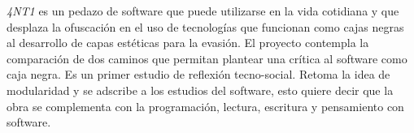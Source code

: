 \textit{4NT1} es un pedazo de software que puede utilizarse en la vida cotidiana y que desplaza la ofuscación en el uso de tecnologías que funcionan como cajas negras al desarrollo de capas estéticas para la evasión. El proyecto contempla la comparación de dos caminos que permitan plantear una crítica al software como caja negra. Es un primer estudio de reflexión tecno-social. Retoma la idea de modularidad y se adscribe a los estudios del software, esto quiere decir que la obra se complementa con la programación, lectura, escritura y pensamiento con software.

\iffalse

- Videotitlán ?
- THREE.studies
- ¿anti? 
\fi
